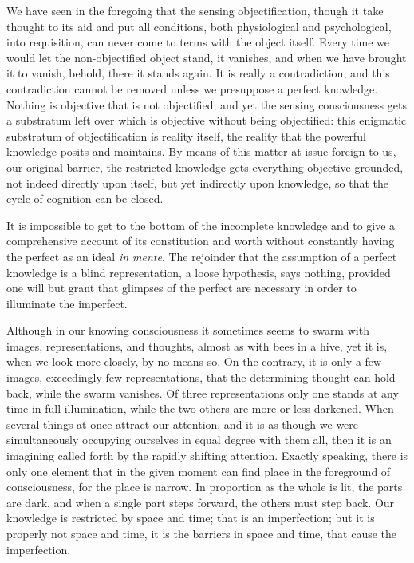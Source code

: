 \documentclass[12pt]{book}
\begin{document}
We have seen in the foregoing that the sensing objectification, though it take
thought to its aid and put all conditions, both physiological and
psychological, into requisition, can never come to terms with the object
itself. Every time we would let the non-objectified object stand, it vanishes,
and when we have brought it to vanish, behold, there it stands again. It is
really a contradiction, and this contradiction cannot be removed unless we
presuppose a perfect knowledge. Nothing is objective that is not objectified;
and yet the sensing consciousness gets a substratum left over which is
objective without being objectified: this enigmatic substratum of
objectification is reality itself, the reality that the powerful knowledge
posits and maintains. By means of this matter-at-issue foreign to us, our
original barrier, the restricted knowledge gets everything objective grounded,
not indeed directly upon itself, but yet indirectly upon knowledge, so that the
cycle of cognition can be closed.

It is impossible to get to the bottom of the incomplete knowledge and to give a
comprehensive account of its constitution and worth without constantly having
the perfect as an ideal \textit{in mente}. The rejoinder that the assumption of
a perfect knowledge is a blind representation, a loose hypothesis, says nothing,
provided one will but grant that glimpses of the perfect are necessary in order
to illuminate the imperfect.

Although in our knowing consciousness it sometimes seems to swarm with images,
representations, and thoughts, almost as with bees in a hive, yet it is, when we
look more closely, by no means so. On the contrary, it is only a few images,
exceedingly few representations, that the determining thought can hold back,
while the swarm vanishes. Of three representations only one stands at any time
in full illumination, while the two others are more or less darkened. When
several things at once attract our attention, and it is as though we were
simultaneously occupying ourselves in equal degree with them all, then it is an
imagining called forth by the rapidly shifting attention. Exactly speaking,
there is only one element that in the given moment can find place in the
foreground of consciousness, for the place is narrow. In proportion as the
whole is lit, the parts are dark, and when a single part steps forward, the
others must step back. Our knowledge is restricted by space and time; that is
an imperfection; but it is properly not space and time, it is the barriers in
space and time, that cause the imperfection.
\end{document}
